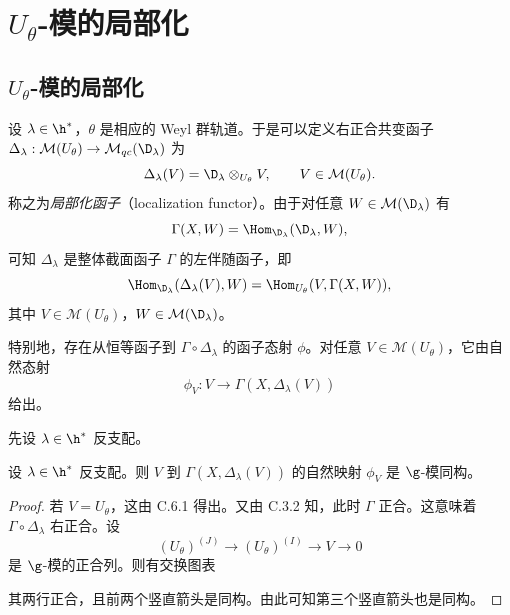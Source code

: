 \chapter{$U_\theta$-模的局部化}
\label{ch:03.3}

\section{$U_\theta$-模的局部化}
\label{sec:03.3.1}

设 $\lambda\in\h^*$，$\theta$ 是相应的 Weyl 群轨道。于是可以定义右正合共变函子 $\Delta_\lambda:\mathcal{M}(U_\theta)\to\mathcal{M}_{qc}(\D_\lambda)$ 为
$$\Delta_\lambda(V)=\D_\lambda\otimes_{U_\theta}V,\qquad V\in\mathcal{M}(U_\theta).$$
称之为\emph{局部化函子}（localization functor）。由于对任意 $W\in\mathcal{M}(\D_\lambda)$ 有
$$\Gamma(X,W)=\Hom_{\D_\lambda}(\D_\lambda,W),$$
可知 $\Delta_\lambda$ 是整体截面函子 $\Gamma$ 的左伴随函子，即
$$\Hom_{\D_\lambda}(\Delta_\lambda(V),W)=\Hom_{U_\theta}(V,\Gamma(X,W)),$$
其中 $V\in\mathcal{M}(U_\theta)$，$W\in\mathcal{M}(\D_\lambda)$。

特别地，存在从恒等函子到 $\Gamma\circ\Delta_\lambda$ 的函子态射 $\phi$。对任意 $V\in\mathcal{M}(U_\theta)$，它由自然态射
$$\phi_V:V\longrightarrow\Gamma(X,\Delta_\lambda(V))$$
给出。

先设 $\lambda\in\h^*$ 反支配。

\begin{lemma}\label{lem:03.1.1}
设 $\lambda\in\h^*$ 反支配。则 $V$ 到 $\Gamma(X,\Delta_\lambda(V))$ 的自然映射 $\phi_V$ 是 $\g$-模同构。
\end{lemma}

\begin{proof}
若 $V=U_\theta$，这由 C.6.1 得出。又由 C.3.2 知，此时 $\Gamma$ 正合。这意味着 $\Gamma\circ\Delta_\lambda$ 右正合。设
$$(U_\theta)^{(J)}\longrightarrow(U_\theta)^{(I)}\longrightarrow V\longrightarrow 0$$
是 $\g$-模的正合列。则有交换图表
\begin{center}
{\small
{}}
\end{center}
其两行正合，且前两个竖直箭头是同构。由此可知第三个竖直箭头也是同构。
\end{proof}


